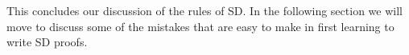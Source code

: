 This concludes our discussion of the rules of SD.
In the following section we will move to discuss some of the mistakes that are easy to make in first learning to write SD proofs.



%
%
%
%
%
%
%
